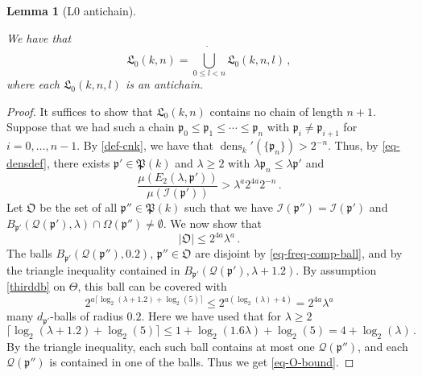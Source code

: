\documentclass[10pt,a4paper]{article}
\theoremstyle{plain}
\newtheorem{lemma}[theorem]{Lemma}
\theoremstyle{definition}
\numberwithin{equation}{subsection}
\DeclareMathOperator{\dens}{\operatorname{dens}}
\newcommand{\fp}{{\mathfrak p}}
\newcommand{\fP}{{\mathfrak P}}
\newcommand{\fL}{{\mathfrak L}}
\newcommand{\scI}{{\mathcal{I}}} %
\newcommand{\fcc}{{\mathcal{Q}}}
\newcommand{\lean}[1]{}
\newcommand{\uses}[1]{}
\newcommand{\leanok}{}
\begin{document}
\begin{lemma}[L0 antichain]
\label{L0-antichain}
\uses{monotone-cube-metrics}
\leanok
\lean{iUnion_L0', pairwiseDisjoint_L0', antichain_L0'}
    We have that
    $$
        \fL_0(k,n) = \dot{\bigcup_{0 \le l < n}} \fL_0(k,n,l)\,,
    $$
    where each $\fL_0(k,n,l)$ is an antichain.
\end{lemma}

\begin{proof}
    \leanok
    It suffices to show that $\fL_0(k,n)$ contains no chain of length $n + 1$. Suppose that we had such a chain $\fp_0 \le \fp_1 \le \dotsb \le \fp_{n}$ with $\fp_i \ne \fp_{i+1}$ for $i =0, \dotsc, n-1$. By \eqref{def-cnk}, we have that $\dens_k'(\{\fp_n\}) > 2^{-n}$. Thus, by \eqref{eq-densdef}, there exists $\fp' \in \fP(k)$ and $\lambda \ge 2$ with $\lambda \fp_n \le \lambda \fp'$ and
    \begin{equation}
        \label{eq-p'}
        \frac{\mu(E_2(\lambda, \fp'))}{\mu(\scI(\fp'))} > \lambda^{a} 2^{4a} 2^{-n}\,.
    \end{equation}
    Let $\mathfrak{O}$ be the set of all $\fp'' \in \fP(k)$ such that we have $ \scI(\fp'') = \scI(\fp')$ and $B_{\fp'}(\fcc(\fp'), \lambda) \cap \Omega(\fp'') \neq \emptyset$.
    We now show that
    \begin{equation}
        \label{eq-O-bound}
        |\mathfrak{O}| \le 2^{4a}\lambda^a\,.
    \end{equation}
    The balls $B_{\fp'}(\fcc(\fp''), 0.2)$, $\fp'' \in \mathfrak{O}$ are disjoint by \eqref{eq-freq-comp-ball},
    and by the triangle inequality contained in $B_{\fp'}(\fcc(\fp'), \lambda+1.2)$.
    By assumption \eqref{thirddb} on $\Theta$, this ball can be covered with
    $$
        2^{a\lceil \log_2(\lambda+1.2) + \log_2(5)\rceil} \le 2^{a(\log_2(\lambda) + 4)} = 2^{4a}\lambda^a
    $$
    many $d_{\fp'}$-balls of radius $0.2$. Here we have used that for $\lambda \ge 2$
    $$
        \lceil \log_2(\lambda + 1.2)  + \log_2(5) \rceil \le 1+ \log_2(1.6  \lambda) + \log_2(5) = 4 + \log_2(\lambda)\,.
    $$
    By the triangle inequality, each such ball contains at most one $\fcc(\fp'')$, and each $\fcc(\fp'')$ is contained in one of the balls. Thus we get \eqref{eq-O-bound}.


\end{proof}
\end{document}
